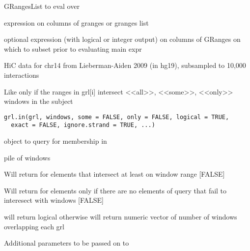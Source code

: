 \documentclass[a4paper]{book}
\begin{document}
%
\begin{Arguments}
\begin{ldescription}
\item[\code{grl}] GRangesList to eval over

\item[\code{expr}] expression on columns of granges or granges list

\item[\code{condition}] optional expression (with logical or integer output) on columns of GRanges on which to subset prior to evaluating main expr
\end{ldescription}
\end{Arguments}
%
\begin{Description}\relax
HiC data for chr14 from Lieberman-Aiden 2009 (in hg19), subsampled
to 10,000 interactions
\end{Description}
%
\begin{Format}
\end{Format}
%
\begin{Description}\relax
Like 
only if the ranges in grl[i] intersect <<all>>, <<some>>, <<only>>  windows in the subject
\end{Description}
%
\begin{Usage}
\begin{verbatim}
grl.in(grl, windows, some = FALSE, only = FALSE, logical = TRUE,
  exact = FALSE, ignore.strand = TRUE, ...)
\end{verbatim}
\end{Usage}
%
\begin{Arguments}
\begin{ldescription}
\item[\code{grl}]  object to query for membership in 

\item[\code{windows}]  pile of windows

\item[\code{some}] Will return  for  elements that intersect at least on window range [FALSE]

\item[\code{only}] Will return  for  elements only if there are no elements of query that fail to interesect with windows [FALSE]

\item[\code{logical}] will return logical otherwise will return numeric vector of number of windows overlapping each grl

\item[\code{...}] Additional parameters to be passed on to 
\end{ldescription}
\end{Arguments}
\end{document}
